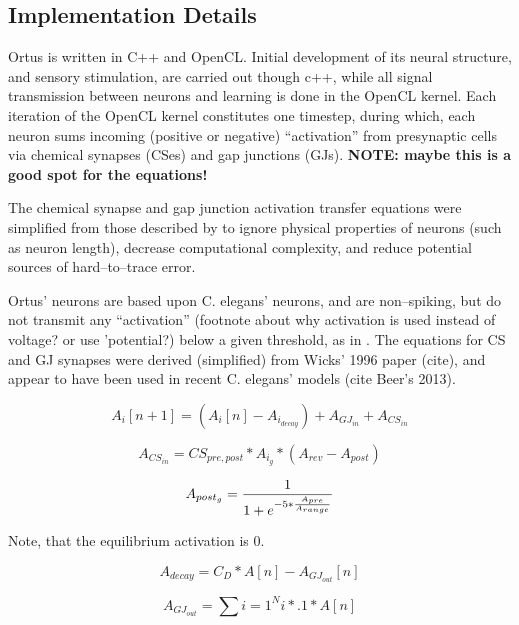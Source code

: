 \documentclass[letterpaper]{article}
\begin{document}
\subsection{Implementation Details} Ortus is written in C++ and OpenCL. Initial development of its neural structure, and sensory stimulation, are carried out though c++, while all signal transmission between neurons and learning is done in the OpenCL kernel. Each iteration of the OpenCL kernel constitutes one timestep, during which, each neuron sums incoming (positive or negative) ``activation'' from presynaptic cells via chemical synapses (CSes) and gap junctions (GJs).  \textbf{NOTE: maybe this is a good spot for the equations!}

The chemical synapse and gap junction activation transfer equations were simplified from those described by \cite{Wicks1996} to ignore physical properties of neurons (such as neuron length), decrease computational complexity, and reduce potential sources of hard--to--trace error.

Ortus' neurons are based upon C. elegans' neurons, and are non--spiking, but do not transmit any ``activation'' (footnote about why activation is used instead of voltage? or use 'potential?) below a given threshold, as in \citep{Graubard1014}. The equations for CS and GJ synapses were derived (simplified) from Wicks' 1996 paper (cite), and appear to have been used in recent C. elegans' models (cite Beer's 2013).

\begin{equation}
    A_{i}[n+1] = (A_i[n] - A_{i_{decay}}) + A_{GJ_{in}} + A_{CS_{in}} 
\end{equation}

\begin{equation}
    A_{CS_{in}} =  CS_{pre,post} * A_{i_{g}} * (A_{rev} - A_{post})
\end{equation}

\begin{equation}
    A_{post_{g}} = {1 \over { 1 + e^{-5 * { A_{pre} \over A_{range} } } }}
\end{equation}

Note, that the equilibrium activation is 0.

\begin{equation}
    A_{decay} = C_D * A[n] - A_{GJ_{out}}[n]
\end{equation}

\begin{equation}
A_{GJ_{out}} = \sum{i=1}^{N} i * .1 * A[n] 
\end{equation}
\end{document}
